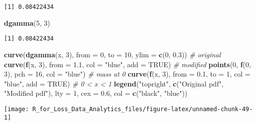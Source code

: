 \documentclass[]{book}
\newenvironment{Shaded}{\begin{snugshade}}{\end{snugshade}}
\newcommand{\KeywordTok}[1]{\textcolor[rgb]{0.13,0.29,0.53}{\textbf{#1}}}
\newcommand{\DataTypeTok}[1]{\textcolor[rgb]{0.13,0.29,0.53}{#1}}
\newcommand{\DecValTok}[1]{\textcolor[rgb]{0.00,0.00,0.81}{#1}}
\newcommand{\FloatTok}[1]{\textcolor[rgb]{0.00,0.00,0.81}{#1}}
\newcommand{\StringTok}[1]{\textcolor[rgb]{0.31,0.60,0.02}{#1}}
\newcommand{\CommentTok}[1]{\textcolor[rgb]{0.56,0.35,0.01}{\textit{#1}}}
\newcommand{\OtherTok}[1]{\textcolor[rgb]{0.56,0.35,0.01}{#1}}
\newcommand{\NormalTok}[1]{#1}
\theoremstyle{definition}
\theoremstyle{definition}
\theoremstyle{definition}
\theoremstyle{remark}
\begin{document}
\begin{verbatim}
[1] 0.08422434
\end{verbatim}

\begin{Shaded}
\begin{Highlighting}[]
\KeywordTok{dgamma}\NormalTok{(}\DecValTok{5}\NormalTok{, }\DecValTok{3}\NormalTok{)}
\end{Highlighting}
\end{Shaded}

\begin{verbatim}
[1] 0.08422434
\end{verbatim}

\begin{Shaded}
\begin{Highlighting}[]
\KeywordTok{curve}\NormalTok{(}\KeywordTok{dgamma}\NormalTok{(x, }\DecValTok{3}\NormalTok{), }\DataTypeTok{from =} \DecValTok{0}\NormalTok{, }\DataTypeTok{to =} \DecValTok{10}\NormalTok{, }\DataTypeTok{ylim =} \KeywordTok{c}\NormalTok{(}\DecValTok{0}\NormalTok{, }\FloatTok{0.3}\NormalTok{))  }\CommentTok{# original}
\KeywordTok{curve}\NormalTok{(}\KeywordTok{f}\NormalTok{(x, }\DecValTok{3}\NormalTok{), }\DataTypeTok{from =} \FloatTok{1.1}\NormalTok{, }\DataTypeTok{col =} \StringTok{"blue"}\NormalTok{, }\DataTypeTok{add =} \OtherTok{TRUE}\NormalTok{)  }\CommentTok{# modified}
\KeywordTok{points}\NormalTok{(}\DecValTok{0}\NormalTok{, }\KeywordTok{f}\NormalTok{(}\DecValTok{0}\NormalTok{, }\DecValTok{3}\NormalTok{), }\DataTypeTok{pch =} \DecValTok{16}\NormalTok{, }\DataTypeTok{col =} \StringTok{"blue"}\NormalTok{)  }\CommentTok{# mass at 0}
\KeywordTok{curve}\NormalTok{(}\KeywordTok{f}\NormalTok{(x, }\DecValTok{3}\NormalTok{), }\DataTypeTok{from =} \FloatTok{0.1}\NormalTok{, }\DataTypeTok{to =} \DecValTok{1}\NormalTok{, }\DataTypeTok{col =} \StringTok{"blue"}\NormalTok{, }\DataTypeTok{add =} \OtherTok{TRUE}\NormalTok{)  }\CommentTok{# 0 < x < 1}
\KeywordTok{legend}\NormalTok{(}\StringTok{"topright"}\NormalTok{, }\KeywordTok{c}\NormalTok{(}\StringTok{"Original pdf"}\NormalTok{, }\StringTok{"Modified pdf"}\NormalTok{), }
       \DataTypeTok{lty =} \DecValTok{1}\NormalTok{, }\DataTypeTok{cex =} \FloatTok{0.6}\NormalTok{, }\DataTypeTok{col =} \KeywordTok{c}\NormalTok{(}\StringTok{"black"}\NormalTok{, }\StringTok{"blue"}\NormalTok{))}
\end{Highlighting}
\end{Shaded}

\begin{center}\texttt{[image: R\_for\_Loss\_Data\_Analytics\_files/figure-latex/unnamed-chunk-49-1]} \end{center}
\end{document}
